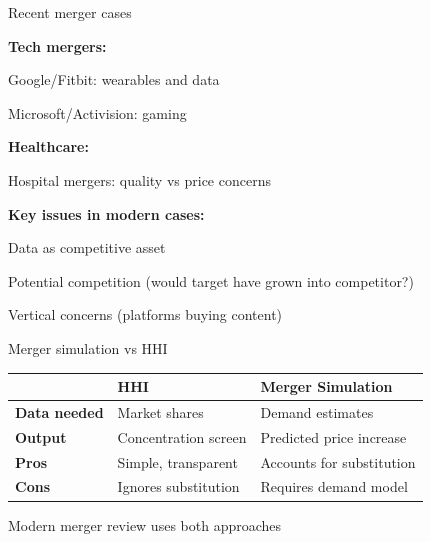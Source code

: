 \documentclass[notes,11pt, aspectratio=169]{beamer}
\newenvironment{wideitemize}{\itemize\addtolength{\itemsep}{10pt}}{\enditemize}
\begin{document}
\begin{frame}{Recent merger cases}
	\begin{wideitemize}
		\item \textbf{Tech mergers:}
		\begin{wideitemize}
			\vspace{5pt}
			\item Google/Fitbit: wearables and data
			\item Microsoft/Activision: gaming
		\end{wideitemize}
		\item \textbf{Healthcare:}
		\begin{wideitemize}
			\vspace{5pt}
			\item Hospital mergers: quality vs price concerns
		\end{wideitemize}
		\item \textbf{Key issues in modern cases:}
		\begin{wideitemize}
			\vspace{5pt}
			\item Data as competitive asset
			\item Potential competition (would target have grown into competitor?)
			\item Vertical concerns (platforms buying content)
		\end{wideitemize}
	\end{wideitemize}
\end{frame}

\begin{frame}{Merger simulation vs HHI}
	\begin{center}
	\begin{tabular}{|l|p{4cm}|p{4cm}|}
		\hline
		& \textbf{HHI} & \textbf{Merger Simulation} \\
		\hline
		\textbf{Data needed} & Market shares & Demand estimates \\
		\hline
		\textbf{Output} & Concentration screen & Predicted price increase \\
		\hline
		\textbf{Pros} & Simple, transparent & Accounts for substitution \\
		\hline
		\textbf{Cons} & Ignores substitution & Requires demand model \\
		\hline
	\end{tabular}
	\end{center}
	\vspace{5pt}
	\begin{wideitemize}
		\item Modern merger review uses both approaches
	\end{wideitemize}
\end{frame}
\end{document}
